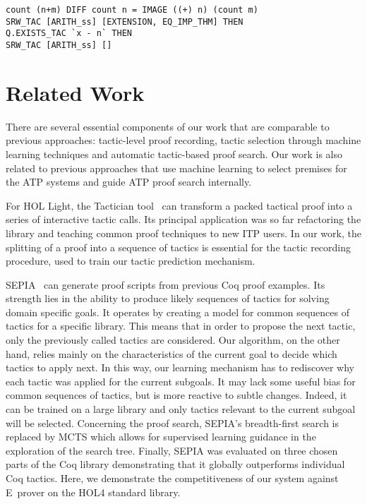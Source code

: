 \documentclass[runningheads,a4paper,draft]{svjour3}
\def\holfour{\textsf{HOL4}\xspace}
\def\hollight{\textsf{HOL Light}\xspace}
\def\coq{\textsf{Coq}\xspace}
\def\eprover{\textsf{E~prover}\xspace}
\begin{document}
\begin{example}\label{ex:cs4}
\begin{lstlisting}[language=SMLSmall]
count (n+m) DIFF count n = IMAGE ((+) n) (count m)
SRW_TAC [ARITH_ss] [EXTENSION, EQ_IMP_THM] THEN
Q.EXISTS_TAC `x - n` THEN
SRW_TAC [ARITH_ss] []
\end{lstlisting}
\end{example}


\section{Related Work}
There are several essential components of our work that are comparable to
previous approaches: tactic-level proof recording, tactic
selection through machine learning techniques and automatic tactic-based proof
search. Our work is also related to previous approaches that use machine
learning to select premises for the ATP systems and guide ATP proof search
internally.

For \hollight, the Tactician tool~\cite{DBLP:conf/sefm/Adams15}
can transform a packed tactical proof into a series of interactive tactic
calls. Its principal application
was so far refactoring the library and teaching common proof techniques to new
ITP users. In our work, the splitting of a proof into a sequence of tactics is
essential for the
tactic recording procedure, used to train our tactic prediction mechanism.

\textsf{SEPIA}~\cite{DBLP:conf/cade/GransdenWR15} can
generate
proof scripts from previous \coq proof examples.
Its strength lies in the ability to produce likely sequences
of tactics for solving domain specific goals. It operates by creating a model
for common sequences of tactics for a specific library.
This means that in order to propose the next tactic, only the previously
called tactics
are considered.
Our algorithm, on the other hand, relies mainly on the characteristics of the
current goal
to decide
which tactics to apply next. In this way, our learning mechanism has to
rediscover why each
tactic was applied for the current subgoals. It may lack some useful bias for
common sequences
of tactics, but is more reactive to subtle changes. Indeed, it can be trained
on a large library and only tactics relevant to the current subgoal will be
selected.
Concerning the proof search, \textsf{SEPIA}'s %
breadth-first search is replaced by MCTS which allows for supervised learning
guidance in the exploration of the search tree.
Finally, \textsf{SEPIA} was evaluated on three chosen parts of the
\coq library demonstrating that it globally outperforms individual \coq
tactics. Here, we demonstrate the competitiveness of our system against
\eprover on the \holfour standard library.
\end{document}
